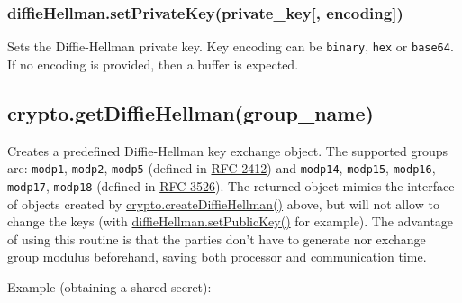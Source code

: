 \subsubsection{diffieHellman.setPrivateKey(private\_key{[},
encoding{]})}\label{diffiehellman.setprivatekeyprivateux5fkey-encoding}

Sets the Diffie-Hellman private key. Key encoding can be
\texttt{\textquotesingle{}binary\textquotesingle{}},
\texttt{\textquotesingle{}hex\textquotesingle{}} or
\texttt{\textquotesingle{}base64\textquotesingle{}}. If no encoding is
provided, then a buffer is expected.

\subsection{crypto.getDiffieHellman(group\_name)}\label{crypto.getdiffiehellmangroupux5fname}

Creates a predefined Diffie-Hellman key exchange object. The supported
groups are: \texttt{\textquotesingle{}modp1\textquotesingle{}},
\texttt{\textquotesingle{}modp2\textquotesingle{}},
\texttt{\textquotesingle{}modp5\textquotesingle{}} (defined in
\href{http://www.rfc-editor.org/rfc/rfc2412.txt}{RFC 2412}) and
\texttt{\textquotesingle{}modp14\textquotesingle{}},
\texttt{\textquotesingle{}modp15\textquotesingle{}},
\texttt{\textquotesingle{}modp16\textquotesingle{}},
\texttt{\textquotesingle{}modp17\textquotesingle{}},
\texttt{\textquotesingle{}modp18\textquotesingle{}} (defined in
\href{http://www.rfc-editor.org/rfc/rfc3526.txt}{RFC 3526}). The
returned object mimics the interface of objects created by
\hyperref[cryptoux5fcryptoux5fcreatediffiehellmanux5fprimeux5fencoding]{crypto.createDiffieHellman()}
above, but will not allow to change the keys (with
\hyperref[cryptoux5fdiffiehellmanux5fsetpublickeyux5fpublicux5fkeyux5fencoding]{diffieHellman.setPublicKey()}
for example). The advantage of using this routine is that the parties
don't have to generate nor exchange group modulus beforehand, saving
both processor and communication time.

Example (obtaining a shared secret):

